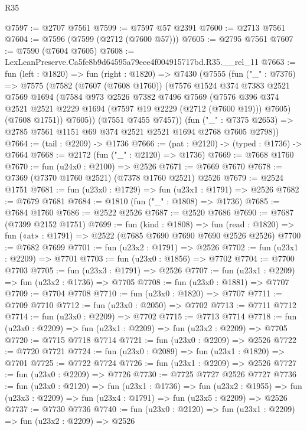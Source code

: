 \begin{lexlean}{R35}
\begin{coremodule}
@7597 := @2707 @7561
@7599 := @7597 @57 @2391
@7600 := @2713 @7561
@7604 := @7596 (@7599 (@2712 (@7600 @57)))
@7605 := @2795 @7561
@7607 := @7590 (@7604 @7605)
@7608 := LexLeanPreserve.Ca5fe8b9d64595a79eee4f004915717bd.R35.__rel_11
@7663 := fun (left : @1820) =>
  fun (right : @1820) =>
  @7430
    (@7555
      (fun ("_" : @7376) =>
      @7575
        (@7582
          (@7607 (@7608 @1760))
          (@7576
            @1524
            @374
            @7383
            @2521
            @7569
            @1694
            (@7584
              @973
              @2526
              @7382
              @7496
              @7569
              (@7576 @396 @374 @2521 @2521 @2229 @1694 (@7597 @19 @2229 (@2712 (@7600 @19))) @7605)
              (@7608 @1751))
            @7605))
        (@7551 @7455 @7457))
      (fun ("_" : @7375 @2653) => @2785 @7561 @1151 @69 @374 @2521 @2521 @1694 @2768 @7605 @2798))
@7664 := (tail : @2209) -> @1736
@7666 := (pat : @2120) -> (typed : @1736) -> @7664
@7668 := @2172 (fun ("_" : @2120) => @1736)
@7669 := @7668 @1760
@7670 := fun (u24x0 : @2100) => @2526
@7671 := @7669 @7670
@7678 := @7369 (@7370 @1760 @2521) (@7378 @1760 @2521) @2526
@7679 := @2524 @1751
@7681 := fun (u23x0 : @1729) => fun (u23x1 : @1791) => @2526
@7682 := @7679 @7681
@7684 := @1810 (fun ("_" : @1808) => @1736)
@7685 := @7684 @1760
@7686 := @2522 @2526
@7687 := @2520 @7686
@7690 := @7687 (@7399 @2152 @1751)
@7699 := fun (kind : @1808) =>
  fun (read : @1820) => fun («at» : @1791) => @2522 (@7685 @7690 @7690 @7690 @2526 @2526)
@7700 := @7682 @7699
@7701 := fun (u23x2 : @1791) => @2526
@7702 := fun (u23x1 : @2209) => @7701
@7703 := fun (u23x0 : @1856) => @7702
@7704 := @7700 @7703
@7705 := fun (u23x3 : @1791) => @2526
@7707 := fun (u23x1 : @2209) => fun (u23x2 : @1736) => @7705
@7708 := fun (u23x0 : @1881) => @7707
@7709 := @7704 @7708
@7710 := fun (u23x0 : @1820) => @7707
@7711 := @7709 @7710
@7712 := fun (u23x0 : @2050) => @7702
@7713 := @7711 @7712
@7714 := fun (u23x0 : @2209) => @7702
@7715 := @7713 @7714
@7718 := fun (u23x0 : @2209) => fun (u23x1 : @2209) => fun (u23x2 : @2209) => @7705
@7720 := @7715 @7718 @7714
@7721 := fun (u23x0 : @2209) => @2526
@7722 := @7720 @7721
@7724 := fun (u23x0 : @2089) => fun (u23x1 : @1820) => @7701
@7725 := @7722 @7724
@7726 := fun (u23x1 : @2209) => @2526
@7727 := fun (u23x0 : @2209) => @7726
@7730 := @7725 @7727 @2526 @7727
@7736 := fun (u23x0 : @2120) =>
  fun (u23x1 : @1736) =>
  fun (u23x2 : @1955) => fun (u23x3 : @2209) => fun (u23x4 : @1791) => fun (u23x5 : @2209) => @2526
@7737 := @7730 @7736
@7740 := fun (u23x0 : @2120) => fun (u23x1 : @2209) => fun (u23x2 : @2209) => @2526

\end{coremodule}
\end{lexlean}
